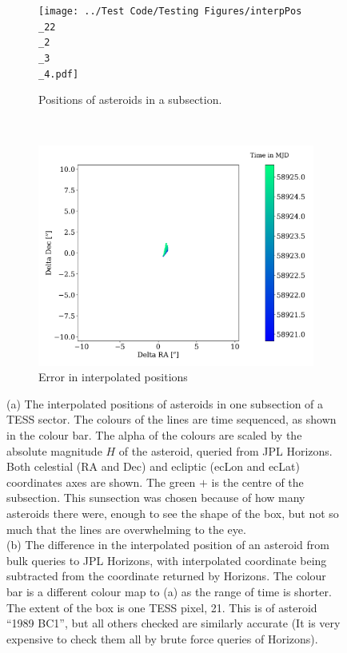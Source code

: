 \documentclass{UCreport}
\begin{document}
\begin{figure}[h!]
  \begin{subfigure}[t]{0.5\textwidth}
    \centering
    \texttt{[image: ../Test Code/Testing Figures/interpPos\\\_22\\\_2\\\_3\\\_4.pdf]}
    \caption[Positions]{Positions of asteroids in a subsection.}
    \label{Fig:interpPos}
  \end{subfigure}
  ~
  \begin{subfigure}[t]{0.5\textwidth}
    \centering
    \includegraphics[width =\textwidth]{../Test Code/Testing Figures/1989 BC1PosCheck.pdf} %
    \caption[Errors]{Error in interpolated positions}
    \label{Fig:errPos}
  \end{subfigure}

  \caption[Interpolated positions and error of asteroids]{
    (a)
    The interpolated positions of asteroids in one subsection of a TESS sector.
    The colours of the lines are time sequenced, as shown in the colour bar.
    The alpha of the colours are scaled by the absolute magnitude $H$ of the asteroid, queried from JPL Horizons.
    Both celestial (RA and Dec) and ecliptic (ecLon and ecLat) coordinates axes are shown.
    The green $+$ is the centre of the subsection.
    This sunsection was chosen because of how many asteroids there were, enough to see the shape of the box, but not so much that the lines are overwhelming to the eye.\\
    (b)
    The difference in the interpolated position of an asteroid from bulk queries to JPL Horizons, with interpolated coordinate being subtracted from the coordinate returned by Horizons. The colour bar is a different colour map to (a) as the range of time is shorter. The extent of the box is one TESS pixel, \qty{21}{\arcsec}. This is of asteroid ``1989 BC1'', but all others checked are similarly accurate (It is very expensive to check them all by brute force queries of Horizons).
  }
  \label{Fig:interpandErrPos}
\end{figure}
\end{document}
